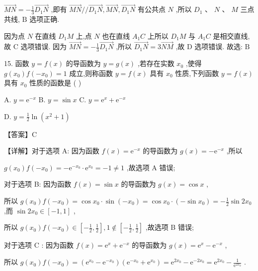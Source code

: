 \documentclass[10pt]{article}
\begin{document}
\(\overrightarrow{MN} =  - \frac{1}{3}\overrightarrow{{D}_{1}N}\) ,即有 \(\overrightarrow{MN}//\overrightarrow{{D}_{1}N},\overrightarrow{MN},\overrightarrow{{D}_{1}N}\) 有公共点 \(N\) ,所以 \({D}_{1}\text{ 、 }N\text{ 、 }M\) 三点共线, \(\mathrm{B}\) 选项正确.

因为点 \(N\) 在直线 \({D}_{1}M\) 上,点 \(N\) 也在直线 \({A}_{1}C\) 上所以 \({D}_{1}M\) 与 \({A}_{1}C\) 是相交直线,故 \(\mathrm{C}\) 选项错误. 因为 \(\overrightarrow{MN} =  - \frac{1}{3}\overrightarrow{{D}_{1}N}\) ,所以 \(\overrightarrow{{D}_{1}N} = 3\overrightarrow{NM}\) ,故 \(\mathrm{D}\) 选项错误. 故选: \(\mathrm{B}\)

15. 函数 \(y = f\left( x\right)\) 的导函数为 \(y = g\left( x\right)\) ,若存在实数 \({x}_{0}\) ,使得 \(g\left( {x}_{0}\right) f\left( {-{x}_{0}}\right)  = 1\) 成立,则称函数 \(y = f\left( x\right)\) 具有 \({x}_{0}\) 性质,下列函数 \(y = f\left( x\right)\) 具有 \({x}_{0}\) 性质的函数是 ( )

A. \(y = {\mathrm{e}}^{-x}\) B. \(y = \sin x\) C. \(y = {\mathrm{e}}^{x} + {\mathrm{e}}^{-x}\)

D. \(y = \frac{1}{2}\ln \left( {{x}^{2} + 1}\right)\)

【答案】C

【详解】对于选项 A: 因为函数 \(f\left( x\right)  = {\mathrm{e}}^{-x}\) 的导函数为 \(g\left( x\right)  =  - {\mathrm{e}}^{-x}\) ,所以

\(g\left( {x}_{0}\right) f\left( {-{x}_{0}}\right)  =  - {\mathrm{e}}^{-{x}_{0}} \cdot  {\mathrm{e}}^{{x}_{0}} =  - 1 \neq  1\) ,故选项 A 错误;

对于选项 B: 因为函数 \(f\left( x\right)  = \sin x\) 的导函数为 \(g\left( x\right)  = \cos x\) ,

所以 \(g\left( {x}_{0}\right) f\left( {-{x}_{0}}\right)  = \cos {x}_{0} \cdot  \sin \left( {-{x}_{0}}\right)  = \cos {x}_{0} \cdot  \left( {-\sin {x}_{0}}\right)  =  - \frac{1}{2}\sin 2{x}_{0}\) ,而 \(\sin 2{x}_{0} \in  \left\lbrack  {-1,1}\right\rbrack\) ,

所以 \(g\left( {x}_{0}\right) f\left( {-{x}_{0}}\right)  \in  \left\lbrack  {-\frac{1}{2},\frac{1}{2}}\right\rbrack  ,1 \notin  \left\lbrack  {-\frac{1}{2},\frac{1}{2}}\right\rbrack\) ,故选项 B 错误;

对于选项 \(\mathrm{C}\) : 因为函数 \(f\left( x\right)  = {\mathrm{e}}^{x} + {\mathrm{e}}^{-x}\) 的导函数为 \(g\left( x\right)  = {\mathrm{e}}^{x} - {\mathrm{e}}^{-x}\) ,

所以 \(g\left( {x}_{0}\right) f\left( {-{x}_{0}}\right)  = \left( {{\mathrm{e}}^{{x}_{0}} - {\mathrm{e}}^{-{x}_{0}}}\right) \left( {{\mathrm{e}}^{-{x}_{0}} + {\mathrm{e}}^{{x}_{0}}}\right)  = {\mathrm{e}}^{2{x}_{0}} - {\mathrm{e}}^{-2{x}_{0}} = {\mathrm{e}}^{2{x}_{0}} - \frac{1}{{\mathrm{e}}^{2{x}_{0}}}\) .
\end{document}
